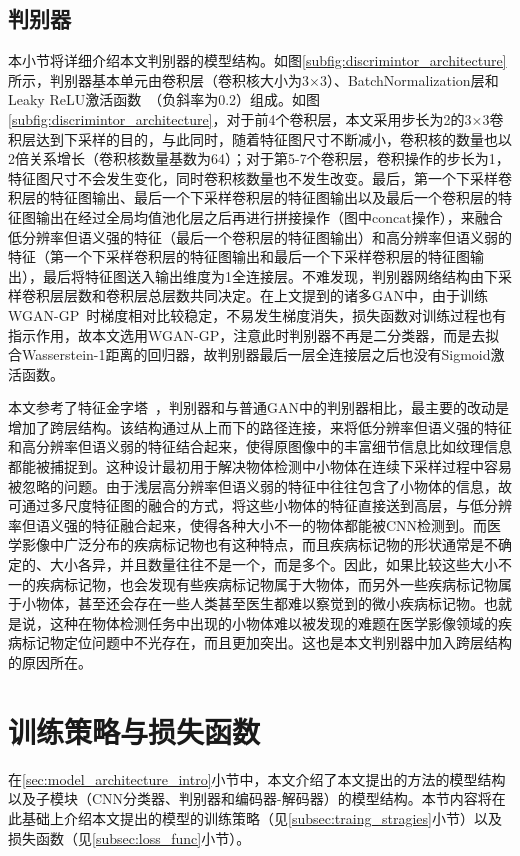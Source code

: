 \subsection{判别器}\label{subsec:discrimintor_model}
本小节将详细介绍本文判别器的模型结构。如图\ref{subfig:discrimintor_architecture}所示，判别器基本单元由卷积层（卷积核大小为3$\times$3）、BatchNormalization层和Leaky ReLU激活函数~\cite{maas2013rectifier}（负斜率为0.2）组成。如图\ref{subfig:discrimintor_architecture}，对于前4个卷积层，本文采用步长为2的3$\times$3卷积层达到下采样的目的，与此同时，随着特征图尺寸不断减小，卷积核的数量也以2倍关系增长（卷积核数量基数为64）；对于第5-7个卷积层，卷积操作的步长为1，特征图尺寸不会发生变化，同时卷积核数量也不发生改变。最后，第一个下采样卷积层的特征图输出、最后一个下采样卷积层的特征图输出以及最后一个卷积层的特征图输出在经过全局均值池化层之后再进行拼接操作（图中concat操作），来融合低分辨率但语义强的特征（最后一个卷积层的特征图输出）和高分辨率但语义弱的特征（第一个下采样卷积层的特征图输出和最后一个下采样卷积层的特征图输出），最后将特征图送入输出维度为1全连接层。不难发现，判别器网络结构由下采样卷积层层数和卷积层总层数共同决定。在上文提到的诸多GAN中，由于训练WGAN-GP~\cite{gulrajani2017improved}时梯度相对比较稳定，不易发生梯度消失，损失函数对训练过程也有指示作用，故本文选用WGAN-GP，注意此时判别器不再是二分类器，而是去拟合Wasserstein-1距离的回归器，故判别器最后一层全连接层之后也没有Sigmoid激活函数。

本文参考了特征金字塔~\cite{lin2017feature}，判别器和与普通GAN中的判别器相比，最主要的改动是增加了跨层结构。该结构通过从上而下的路径连接，来将低分辨率但语义强的特征和高分辨率但语义弱的特征结合起来，使得原图像中的丰富细节信息比如纹理信息都能被捕捉到。这种设计最初用于解决物体检测中小物体在连续下采样过程中容易被忽略的问题。由于浅层高分辨率但语义弱的特征中往往包含了小物体的信息，故可通过多尺度特征图的融合的方式，将这些小物体的特征直接送到高层，与低分辨率但语义强的特征融合起来，使得各种大小不一的物体都能被CNN检测到。而医学影像中广泛分布的疾病标记物也有这种特点，而且疾病标记物的形状通常是不确定的、大小各异，并且数量往往不是一个，而是多个。因此，如果比较这些大小不一的疾病标记物，也会发现有些疾病标记物属于大物体，而另外一些疾病标记物属于小物体，甚至还会存在一些人类甚至医生都难以察觉到的微小疾病标记物。也就是说，这种在物体检测任务中出现的小物体难以被发现的难题在医学影像领域的疾病标记物定位问题中不光存在，而且更加突出。这也是本文判别器中加入跨层结构的原因所在。

\section{训练策略与损失函数}\label{sec:loss_func_training_stragies}
在\ref{sec:model_architecture_intro}小节中，本文介绍了本文提出的方法的模型结构以及子模块（CNN分类器、判别器和编码器-解码器）的模型结构。本节内容将在此基础上介绍本文提出的模型的训练策略（见\ref{subsec:traing_stragies}小节）以及损失函数（见\ref{subsec:loss_func}小节）。

